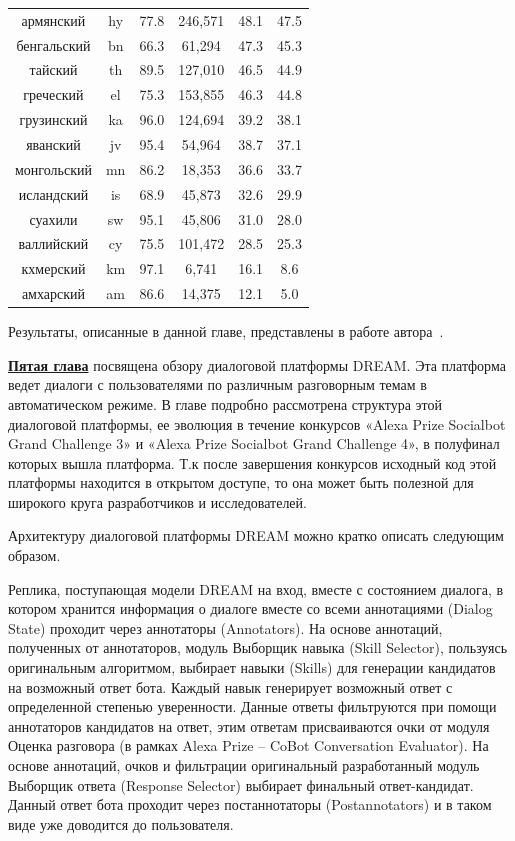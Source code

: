 \begin{table}
{\begin{tabular}{|c|c|c||c|c|c|}
армянский & hy & 77.8 & 246,571 & 48.1 & 47.5\\
бенгальский & bn & 66.3 & 61,294 & 47.3 & 45.3\\
тайский & th & 89.5 & 127,010 & 46.5 & 44.9\\
греческий & el & 75.3 & 153,855 & 46.3 & 44.8\\
грузинский & ka & 96.0 & 124,694 & 39.2 & 38.1\\
яванский & jv & 95.4 & 54,964 & 38.7 & 37.1\\
монгольский & mn & 86.2 & 18,353 & 36.6 & 33.7\\
исландский & is & 68.9 & 45,873 & 32.6 & 29.9\\
суахили & sw & 95.1 & 45,806 & 31.0 & 28.0\\
валлийский & cy & 75.5 & 101,472 & 28.5 & 25.3\\
кхмерский & km & 97.1 & 6,741 & 16.1 & 8.6\\
амхарский & am & 86.6 & 14,375 & 12.1 & 5.0\\ \hline
\end{tabular}
}
\end{table}

Результаты, описанные в данной главе, представлены в работе автора~\cite{rutopics}.

\underline{\textbf{Пятая глава}} посвящена обзору диалоговой платформы DREAM. Эта платформа ведет диалоги с пользователями по различным разговорным темам в автоматическом режиме. В главе подробно рассмотрена структура этой диалоговой платформы, ее эволюция в течение конкурсов «Alexa Prize Socialbot Grand Challenge 3» и «Alexa Prize Socialbot Grand Challenge 4», в полуфинал которых вышла платформа. Т.к после завершения конкурсов исходный код этой платформы находится в открытом доступе, то она может быть полезной для широкого круга разработчиков и исследователей.

Архитектуру диалоговой платформы DREAM можно кратко описать следующим образом. %

Реплика, поступающая модели {DREAM} на вход, вместе с состоянием диалога, в котором хранится информация о диалоге вместе со всеми аннотациями (Dialog State) проходит через аннотаторы (Annotators). На основе аннотаций, полученных от аннотаторов, модуль Выборщик навыка (Skill Selector), пользуясь оригинальным алгоритмом, выбирает навыки (Skills) для генерации кандидатов на возможный ответ бота. Каждый навык генерирует возможный ответ с определенной степенью уверенности. Данные ответы фильтруются при помощи аннотаторов кандидатов на ответ, этим ответам присваиваются очки от модуля Оценка разговора (в рамках Alexa Prize -- CoBot Conversation Evaluator). На основе аннотаций, очков и фильтрации оригинальный разработанный модуль Выборщик ответа (Response Selector) выбирает финальный ответ-кандидат. Данный ответ бота проходит через постаннотаторы (Postannotators) и в таком виде уже доводится до пользователя.

